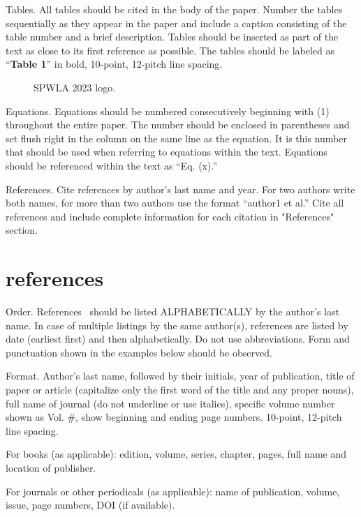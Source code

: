 \documentclass[10pt,twocolumn,twoside]{article}
\begin{document}
Tables. All tables should be cited in the body of the paper. Number the tables sequentially as they appear in the paper and include a caption consisting of the table number and a brief description. Tables should be inserted as part of the text as close to its first reference as possible. The tables should be labeled as “\textbf{Table 1}” in bold, 10-point, 12-pitch line spacing.

\begin{figure}
	\centering
	\caption{SPWLA 2023 logo.}
	\label{fig:logo}
\end{figure}


Equations. Equations should be numbered consecutively beginning with (1) throughout the entire paper. The number should be enclosed in parentheses and set flush right in the column on the same line as the equation. It is this number that should be used when referring to equations within the text. Equations should be referenced within the text as “Eq. (x).”

References. Cite references by author’s last name and year. For two authors write both names, for more than two authors use the format “author1 et al.” Cite all references and include complete information for each citation in "References" section.

\section{references}

Order. References~\citep{Archie1942} should be listed ALPHABETICALLY by the author’s last name. In case of multiple listings by the same author(s), references are listed by date (earliest first) and then alphabetically. Do not use abbreviations. Form and punctuation shown in the examples below should be observed.

Format. Author's last name, followed by their initials, year of publication, title of paper or article (capitalize only the first word of the title and any proper nouns), full name of journal (do not underline or use italics), specific volume number shown as Vol. \#, show beginning and ending page numbers. 10-point, 12-pitch line spacing.

For books (as applicable): edition, volume, series, chapter, pages, full name and location of publisher.

For journals or other periodicals (as applicable): name of publication, volume, issue, page numbers, DOI (if available).
\end{document}
